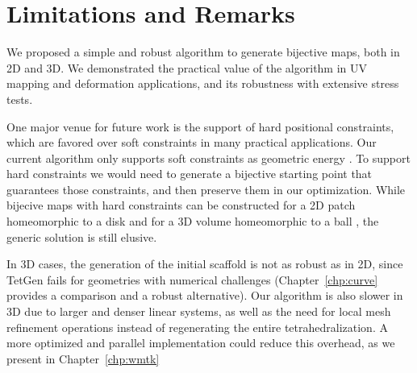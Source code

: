 \section{Limitations and Remarks}

We proposed a simple and robust algorithm to generate bijective maps, both in 2D and 3D. We demonstrated the practical value of the algorithm in UV mapping and deformation applications, and its robustness with extensive stress tests.

One major venue for future work is the support of hard positional constraints, which are favored over soft constraints in many practical applications. Our current algorithm only supports soft constraints as geometric energy \cite{Schuller:2013}. To support hard constraints we would need to generate a bijective starting point that guarantees those constraints, and then preserve them in our optimization. While bijecive maps with hard constraints can be constructed for a 2D patch homeomorphic to a disk \cite{Weber:2014:LIP} and for a 3D volume homeomorphic to a ball \cite{Campen:2016}, the generic solution is still elusive.

In 3D cases, the generation of the initial scaffold is not as robust as in 2D, since TetGen fails for geometries with numerical challenges (Chapter~\ref{chp:curve} provides a comparison and a robust alternative). 
Our algorithm is also slower in 3D due to larger and denser linear systems, as well as the need for local mesh refinement operations instead of regenerating the entire tetrahedralization. A more optimized and parallel implementation could reduce this overhead, as we present in Chapter~\ref*{chp:wmtk}